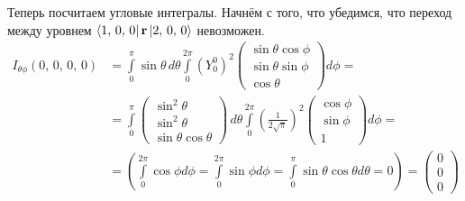 Теперь посчитаем угловые интегралы. Начнём с того, что убедимся, что переход между уровнем $\bra{1,\,0,\,0}\mathbf{r}\ket{2,\,0,\,0}$ невозможен.
\begin{align*}
    I_{\theta\phi}(0,\,0,\,0,\,0) &= \int\limits_{0}^{\pi}\sin\theta\,d\theta\int\limits_{0}^{2\pi}(Y^0_0)^2 \begin{pmatrix} \sin\theta\cos\phi \\ \sin\theta\sin\phi \\ \cos\theta \end{pmatrix} d\phi = \\& = \int\limits_{0}^{\pi} \begin{pmatrix} \sin^2 \theta \\ \sin^2 \theta \\ \sin\theta\cos\theta \end{pmatrix} \, d\theta \int\limits_{0}^{2\pi} \left(\frac{1}{2\sqrt{\pi}}\right)^2 \begin{pmatrix} \cos\phi \\ \sin\phi \\ 1 \end{pmatrix} d\phi = \\& = \left( \int\limits_{0}^{2\pi} \cos\phi d\phi = \int\limits_{0}^{2\pi} \sin\phi d\phi = \int\limits_{0}^{\pi} \sin\theta \cos\theta d\theta = 0 \right) = \begin{pmatrix} 0 \\ 0 \\ 0
    \end{pmatrix}
\end{align*}

